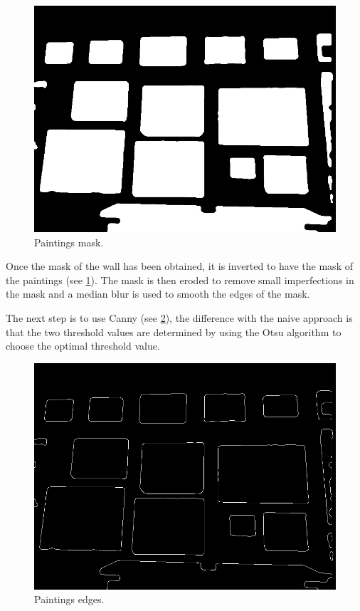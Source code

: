\begin{figure}
    \includegraphics[width=\linewidth]{images/IMG_20190323_121447_paintings-mask.jpg}
    \centering
    \caption{Paintings mask.}
    \label{fig:paiting_detection_paintings-mask}
\end{figure}

Once the mask of the wall has been obtained, it is inverted to have the mask of the paintings (see \ref{fig:paiting_detection_paintings-mask}). The mask is then eroded to remove small imperfections in the mask and a median blur is used to smooth the edges of the mask.

The next step is to use Canny (see \ref{fig:paiting_detection_paintings-edges}), the difference with the naive approach is that the two threshold values are determined by using the Otsu algorithm to choose the optimal threshold value.

\begin{figure}
    \includegraphics[width=\linewidth]{images/IMG_20190323_121447_edges.jpg}
    \centering
    \caption{Paintings edges.}
    \label{fig:paiting_detection_paintings-edges}
\end{figure}

